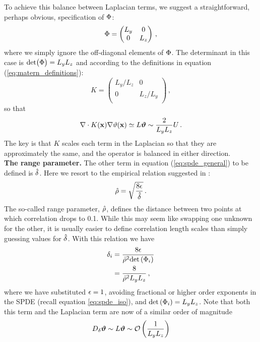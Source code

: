 To achieve this balance between Laplacian terms, we suggest a straightforward,
perhaps obvious, specification of $\Phi$:
\begin{equation*}
    \Phi =
        \begin{pmatrix}
            L_y & 0     \\
            0   & L_z   \\
        \end{pmatrix} \, ,
\end{equation*}
where we simply ignore the off-diagonal elements of $\Phi$.
The determinant in this case is $\text{det}\big(\Phi\big) = L_yL_z$ and
according to the definitions in equation (\ref{eq:matern_definitions}):
\begin{equation*}
    K =
        \begin{pmatrix}
            L_y/L_z & 0     \\
            0   & L_z/L_y   \\
        \end{pmatrix} \, ,
\end{equation*}
so that
\begin{equation*}
    \nabla\cdot K(\mathbf{x})\nabla\vartheta(\mathbf{x}) \simeq L\bm{\vartheta}  \sim \dfrac{2}{L_yL_z}U \, .
\end{equation*}
The key is that $K$ scales each term in the Laplacian so that they are
approximately the same, and the operator is balanced in either direction.\\

\noindent\textbf{The range parameter.}
The other term in equation (\ref{eq:spde_general}) to be defined is $\hat{\delta}$.
Here we resort to the empirical relation suggested in
\citet{RSSB:RSSB777}:
\begin{equation*}
    \hat{\rho} = \sqrt{\dfrac{8\epsilon}{\hat{\delta}}} \, .
\end{equation*}
The so-called range parameter, $\hat{\rho}$, defines the
distance between two points at which correlation drops to 0.1.
While this may seem like swapping one unknown for the other, it is usually easier to
define correlation length scales than simply guessing values for $\hat{\delta}$.
With this relation we have
\begin{equation*}
    \begin{aligned}
        \delta_i &= \dfrac{8\epsilon}{\hat{\rho}^2\text{det}\left(\Phi_{i}\right)} \\
                 &= \dfrac{8}{\hat{\rho}^2 L_y L_z} \, ,
    \end{aligned}
\end{equation*}
where we have substituted $\epsilon=1$, avoiding fractional or higher order exponents
in the SPDE (recall equation \eqref{eq:spde_iso}), and $\text{det}\left(\Phi_{i}\right) = L_yL_z$.
Note that both this term and the Laplacian term are now of a similar order of
magnitude
\begin{equation*}
    D_{\delta}\bm{\vartheta} \sim L\bm{\vartheta} \sim \mathcal{O}\left(\dfrac{1}{L_y L_z}\right)
\end{equation*}
\\

